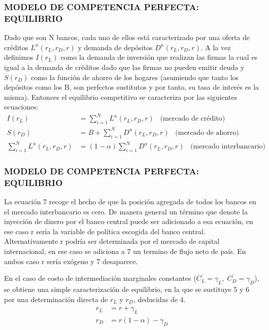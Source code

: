 \begin{frame}
    \frametitle{{\normalsize MODELO DE COMPETENCIA PERFECTA: EQUILIBRIO} {}}
    Dado que son N bancos, cada uno de ellos está caracterizado por una oferta de créditos $L^{n}(r_{L}, r_{D}, r)$ y demanda de depósitos $D^{n}(r_{L}, r_{D}, r)$. A la vez  definimos $I(r_{L})$ como la demanda de inversión que realizan las firmas la cual es igual a la demanda de créditos dado que las firmas no pueden emitir deuda y $S(r_{D}) $ como la función de ahorro de los hogares (asumiendo que tanto los depósitos como los B, son perfectos sustitutos y por tanto, su tasa de interés es la misma). Entonces el equilibrio competitivo se caracteriza por las siguientes ecuaciones:
    {\footnotesize  \begin{align}
     I(r_{L})&=\sum_{i=1}^{N}L^{n}(r_{L}, r_{D}, r) \;\;\; \mbox{(mercado de crédito)}\\
     S(r_{D})&=B+\sum_{i=1}^{N}D^{n}(r_{L}, r_{D}, r) \;\;\; \mbox{(mercado de ahorro)}\\
     \sum_{i=1}^{N}L^{n}(r_{L}, r_{D}, r)&=(1-\alpha)\sum_{i=1}^{N}D^{n}(r_{L}, r_{D}, r) \;\;\; \mbox{(mercado interbancario)}
     \end{align} 
    }
    
    
\end{frame}



\begin{frame}
    \frametitle{{\normalsize MODELO DE COMPETENCIA PERFECTA: EQUILIBRIO} {}}
   La ecuación 7 recoge el hecho de que la posición agregada de todos los bancos en el mercado interbancario es cero. De manera general un término que denote la inyección de dinero por el banco central puede ser adicionado a esa ecuación, en ese caso r sería la variable de política escogida del banco central. Alternativamente r podría ser determinada por el mercado de capital internacional, en ese caso se adiciona a 7 un termino de flujo neto de país. En ambos caso r sería exógeno y 7 desaparece.
   
   En el caso de costo de intermediación  marginales constantes ($C_{L}^{'}=\gamma_{L},\; C_{D}^{'}=\gamma_{D} $),  se obtiene una simple caracterización de equilibrio, en la que se sustituye 5 y 6 por una determinación directa de $r_{L}$ y $r_{D}$, deducidas de 4.
   \begin{align}
   r_{L}&=r+\gamma_{L} \\
   r_{D}&=r(1-\alpha)-\gamma_{D} 
   \end{align} 
    
\end{frame}



